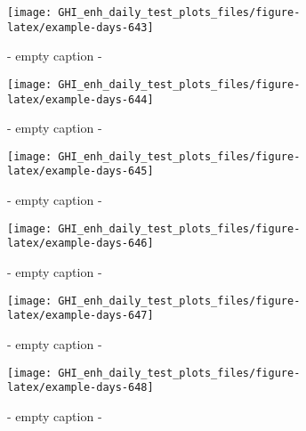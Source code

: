 \documentclass[
  10pt,
  a4paper,oneside]{article}
\begin{document}
\begin{figure}[H]

{\centering \texttt{[image: GHI\_enh\_daily\_test\_plots\_files/figure-latex/example-days-643]} 

}

\caption{ - empty caption - }\label{fig:example-days-643}
\end{figure}

\begin{figure}[H]

{\centering \texttt{[image: GHI\_enh\_daily\_test\_plots\_files/figure-latex/example-days-644]} 

}

\caption{ - empty caption - }\label{fig:example-days-644}
\end{figure}

\begin{figure}[H]

{\centering \texttt{[image: GHI\_enh\_daily\_test\_plots\_files/figure-latex/example-days-645]} 

}

\caption{ - empty caption - }\label{fig:example-days-645}
\end{figure}

\begin{figure}[H]

{\centering \texttt{[image: GHI\_enh\_daily\_test\_plots\_files/figure-latex/example-days-646]} 

}

\caption{ - empty caption - }\label{fig:example-days-646}
\end{figure}

\begin{figure}[H]

{\centering \texttt{[image: GHI\_enh\_daily\_test\_plots\_files/figure-latex/example-days-647]} 

}

\caption{ - empty caption - }\label{fig:example-days-647}
\end{figure}

\begin{figure}[H]

{\centering \texttt{[image: GHI\_enh\_daily\_test\_plots\_files/figure-latex/example-days-648]} 

}

\caption{ - empty caption - }\label{fig:example-days-648}
\end{figure}
\end{document}
